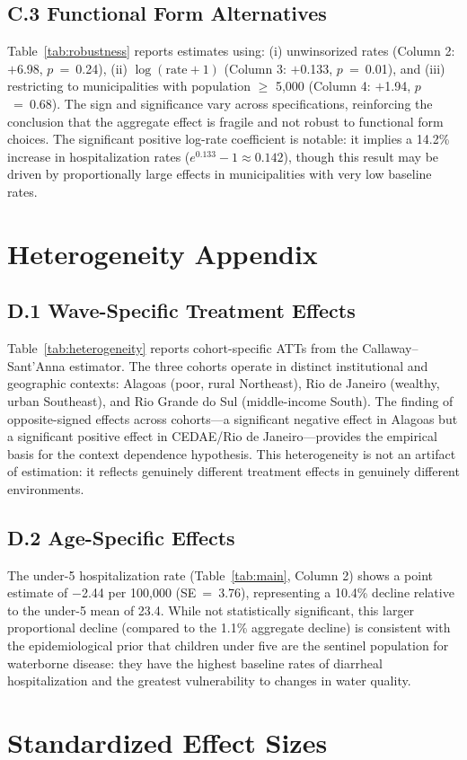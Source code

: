 \documentclass[12pt]{article}
\begin{document}
\subsection*{C.3 Functional Form Alternatives}

Table~\ref{tab:robustness} reports estimates using: (i) unwinsorized rates (Column 2: $+$6.98, $p$~=~0.24), (ii) $\log(\text{rate} + 1)$ (Column 3: $+$0.133, $p$~=~0.01), and (iii) restricting to municipalities with population $\geq$ 5,000 (Column 4: $+$1.94, $p$~=~0.68). The sign and significance vary across specifications, reinforcing the conclusion that the aggregate effect is fragile and not robust to functional form choices. The significant positive log-rate coefficient is notable: it implies a 14.2\% increase in hospitalization rates ($e^{0.133} - 1 \approx 0.142$), though this result may be driven by proportionally large effects in municipalities with very low baseline rates.

\section{Heterogeneity Appendix}
\label{app:heterogeneity}

\subsection*{D.1 Wave-Specific Treatment Effects}

Table~\ref{tab:heterogeneity} reports cohort-specific ATTs from the Callaway--Sant'Anna estimator. The three cohorts operate in distinct institutional and geographic contexts: Alagoas (poor, rural Northeast), Rio de Janeiro (wealthy, urban Southeast), and Rio Grande do Sul (middle-income South). The finding of opposite-signed effects across cohorts---a significant negative effect in Alagoas but a significant positive effect in CEDAE/Rio de Janeiro---provides the empirical basis for the context dependence hypothesis. This heterogeneity is not an artifact of estimation: it reflects genuinely different treatment effects in genuinely different environments.

\subsection*{D.2 Age-Specific Effects}

The under-5 hospitalization rate (Table~\ref{tab:main}, Column 2) shows a point estimate of $-$2.44 per 100,000 (SE~=~3.76), representing a 10.4\% decline relative to the under-5 mean of 23.4. While not statistically significant, this larger proportional decline (compared to the 1.1\% aggregate decline) is consistent with the epidemiological prior that children under five are the sentinel population for waterborne disease: they have the highest baseline rates of diarrheal hospitalization and the greatest vulnerability to changes in water quality.

\section{Standardized Effect Sizes}
\label{sec:sde}


\end{document}
